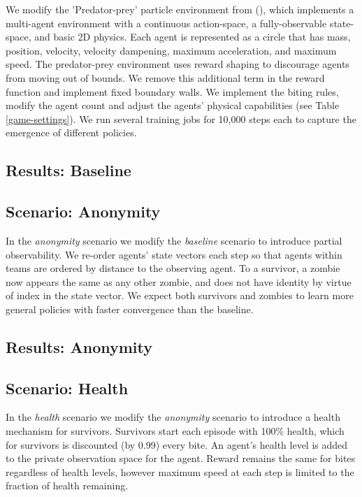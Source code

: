 \documentclass[11pt,a4paper]{article}
\begin{document}
We modify the 'Predator-prey' particle environment from (), which implements a multi-agent environment with a continuous action-space, a fully-observable state-space, and basic 2D physics.
Each agent is represented as a circle that has mass, position, velocity, velocity dampening, maximum acceleration, and maximum speed.
The predator-prey environment uses reward shaping to discourage agents from moving out of bounds.
We remove this additional term in the reward function and implement fixed boundary walls.
We implement the biting rules, modify the agent count and adjust the agents' physical capabilities (see Table \ref{game-settings}).
We run several training jobs for 10,000 steps each to capture the emergence of different policies.

\subsection{Results: Baseline}

\subsection{Scenario: Anonymity}
\label{sec:anon}

In the \emph{anonymity} scenario we modify the \emph{baseline} scenario to introduce partial observability.
We re-order agents' state vectors each step so that agents within teams are ordered by distance to the observing agent.
To a survivor, a zombie now appears the same as any other zombie, and does not have identity by virtue of index in the state vector.
We expect both survivors and zombies to learn more general policies with faster convergence than the baseline.

\subsection{Results: Anonymity}

\subsection{Scenario: Health}
\label{sec:health}

In the \emph{health} scenario we modify the \emph{anonymity} scenario to introduce a health mechanism for survivors.
Survivors start each episode with 100\% health, which for survivors is discounted (by 0.99) every bite.
An agent's health level is added to the private observation space for the agent.
Reward remains the same for bites regardless of health levels,
however maximum speed at each step is limited to the fraction of health remaining.
\end{document}
